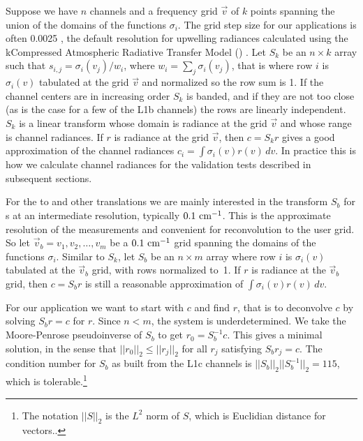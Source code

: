 \documentclass[journal]{IEEEtran}
\begin{document}
Suppose we have $n$ channels and a frequency grid $\vec v$ of $k$
points spanning the union of the domains of the functions
$\sigma_i$.  The grid step size for our applications is often 0.0025
{\wn}, the default resolution for upwelling radiances calculated
using the kCompressed Atmospheric Radiative Transfer Model (\kcarta)
\cite{kcarta1}.  Let $S_k$ be an $n\times k$ array such that
$s_{i,j} = \sigma_i(v_j)/w_i$, where $w_i = \sum_j \sigma_i(v_j)$,
that is where row $i$ is $\sigma_i(v)$ tabulated at the grid $\vec
v$ and normalized so the row sum is 1.  If the channel centers are
in increasing order $S_k$ is banded, and if they are not too close
(as is the case for a few of the L1b channels) the rows are linearly
independent.  $S_k$ is a linear transform whose domain is radiance
at the grid $\vec v$ and whose range is channel radiances.  If $r$
is radiance at the grid $\vec v$, then $c = S_k r$ gives a good
approximation of the channel radiances $c_i =
\int\sigma_i(v)r(v)\,dv$.  In practice this is how we calculate
{\airs} channel radiances for the validation tests described in
subsequent sections.


For the {\airs} to {\cris} and other translations we are mainly
interested in the transform $S_b$ for {\srf}s at an intermediate
resolution, typically $0.1~\mbox{cm$^{-1}$}$.  This is the approximate resolution
of the {\srf} measurements and convenient for reconvolution to the
{\cris} user grid.  So let $\vec v_b = v_1,v_2,\ldots,v_m$ be a
$0.1~\mbox{cm$^{-1}$}$ grid spanning the domains of the functions $\sigma_i$.
Similar to $S_k$, let $S_b$ be an $n\times m$ array where row $i$ is
$\sigma_i(v)$ tabulated at the $\vec v_b$ grid, with rows normalized
to~1.  If $r$ is radiance at the $\vec v_b$ grid, then $c = S_b r$
is still a reasonable approximation of $\int\sigma_i(v)r(v)\,dv$.

For our application we want to start with $c$ and find $r$, that is
to deconvolve $c$ by solving $S_b r = c$ for $r$.  Since $n < m$,
the system is underdetermined.  We take the Moore-Penrose
pseudoinverse \cite{wiki:pinv, strang:linalg} of $S_b$ to get $r_0 =
S_b^{-1} c$.  This gives a minimal solution, in the sense that
$||r_0||_2 \le ||r_j||_2$ for all $r_j$ satisfying $S_b r_j = c$.
The condition number for $S_b$ as built from the L1c channels is
$||S_b||_2||S_b^{-1}||_2 = 115$, which is tolerable.\footnote{The
  notation $||S||_2$ is the $L^2$ norm of $S$, which is Euclidian
  distance for vectors.\cite{wiki:norm}.}
\end{document}
